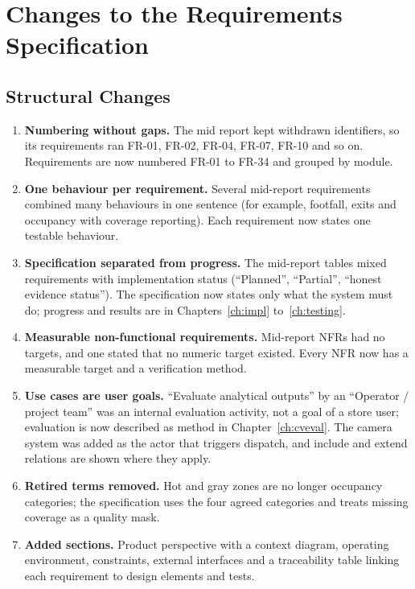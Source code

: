 \chapter{Changes to the Requirements Specification}
\label{app:req-changes}

\section{Structural Changes}
\begin{enumerate}
\item \textbf{Numbering without gaps.} The mid report kept withdrawn identifiers, so its requirements ran FR-01, FR-02, FR-04, FR-07, FR-10 and so on. Requirements are now numbered FR-01 to FR-34 and grouped by module.
\item \textbf{One behaviour per requirement.} Several mid-report requirements combined many behaviours in one sentence (for example, footfall, exits and occupancy with coverage reporting). Each requirement now states one testable behaviour.
\item \textbf{Specification separated from progress.} The mid-report tables mixed requirements with implementation status (``Planned'', ``Partial'', ``honest evidence status''). The specification now states only what the system must do; progress and results are in Chapters~\ref{ch:impl} to~\ref{ch:testing}.
\item \textbf{Measurable non-functional requirements.} Mid-report NFRs had no targets, and one stated that no numeric target existed. Every NFR now has a measurable target and a verification method.
\item \textbf{Use cases are user goals.} ``Evaluate analytical outputs'' by an ``Operator / project team'' was an internal evaluation activity, not a goal of a store user; evaluation is now described as method in Chapter~\ref{ch:cveval}. The camera system was added as the actor that triggers dispatch, and include and extend relations are shown where they apply.
\item \textbf{Retired terms removed.} Hot and gray zones are no longer occupancy categories; the specification uses the four agreed categories and treats missing coverage as a quality mask.
\item \textbf{Added sections.} Product perspective with a context diagram, operating environment, constraints, external interfaces and a traceability table linking each requirement to design elements and tests.
\end{enumerate}


